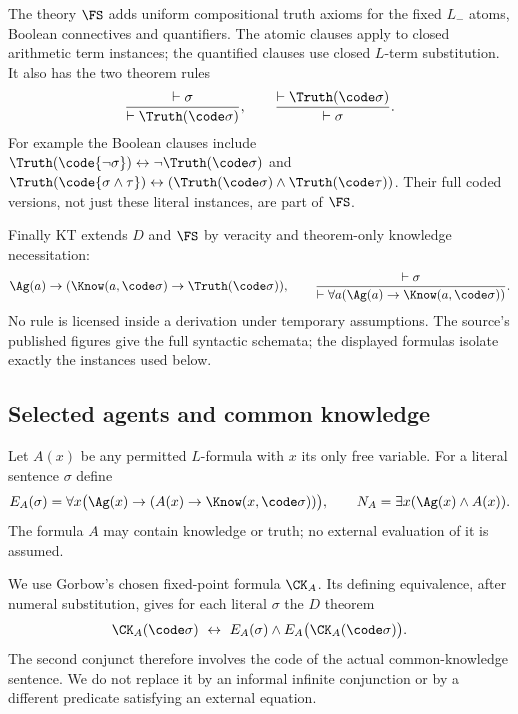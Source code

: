 \documentclass[11pt]{article}
\begin{document}
The theory $\FS$ adds uniform compositional truth axioms for the fixed
$L_-$ atoms, Boolean connectives and quantifiers. The atomic clauses
apply to closed arithmetic term instances; the quantified clauses use
closed $L$-term substitution. It also has the two theorem rules
\[
 \frac{\vdash\sigma}{\vdash\Truth(\code\sigma)},
 \qquad
 \frac{\vdash\Truth(\code\sigma)}{\vdash\sigma}.
\]
For example the Boolean clauses include
$\Truth(\code{\neg\sigma})\leftrightarrow\neg\Truth(\code\sigma)$
and
$\Truth(\code{\sigma\wedge\tau})\leftrightarrow
(\Truth(\code\sigma)\wedge\Truth(\code\tau))$.
Their full coded versions, not just these literal instances, are part
of $\FS$.

Finally KT extends $D$ and $\FS$ by veracity and theorem-only knowledge
necessitation:
\begin{equation}\label{eq:veracity}
 \Ag(a)\to(\Know(a,\code\sigma)\to\Truth(\code\sigma)),
 \qquad
 \frac{\vdash\sigma}{\vdash\forall a(\Ag(a)\to\Know(a,\code\sigma))}.
\end{equation}
No rule is licensed inside a derivation under temporary assumptions.
The source's published figures give the full syntactic schemata;
the displayed formulas isolate exactly the instances used below.

\subsection{Selected agents and common knowledge}

Let $A(x)$ be any permitted $L$-formula with $x$ its only free variable.
For a literal sentence $\sigma$ define
\[
 E_A(\sigma)=\forall x\bigl(\Ag(x)\to
                (A(x)\to\Know(x,\code\sigma))\bigr),
 \qquad
 N_A=\exists x(\Ag(x)\wedge A(x)).
\]
The formula $A$ may contain knowledge or truth; no external evaluation
of it is assumed.

We use Gorbow's chosen fixed-point formula $\CK_A$. Its defining
equivalence, after numeral substitution, gives for each literal
$\sigma$ the $D$ theorem
\begin{equation}\label{eq:fixed}
 \CK_A(\code\sigma)\ \leftrightarrow\
 E_A(\sigma)\wedge E_A\bigl(\CK_A(\code\sigma)\bigr).
\end{equation}
The second conjunct therefore involves the code of the actual
common-knowledge sentence. We do not replace it by an informal infinite
conjunction or by a different predicate satisfying an external equation.
\end{document}
